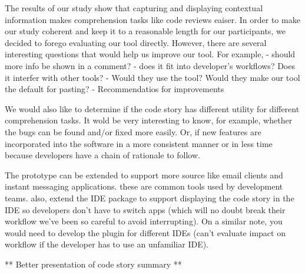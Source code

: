 \documentclass[../manifest.tex]{subfiles}
\begin{document}
The results of our study show that capturing and displaying contextual information makes comprehension tasks like code reviews eaiser. In order to make our study coherent and keep it to a reasonable length for our participants, we decided to forego evaluating our tool directly. However, there are several interesting questions that would help us improve our tool. For example,
  - should more info be shown in a comment?
  - does it fit into developer's workflows? Does it interfer with other tools?
  - Would they use the tool? Would they make our tool the default for pasting?
  - Recommendatios for improvements

We would also like to determine if the code story has different utility for different comprehension tasks. It wold be very interesting to know, for example, whether the bugs can be found and/or fixed more easily. Or, if new features are incorporated into the software in a more consistent manner or in less time because developers have a chain of rationale to follow.

The prototype can be extended to support more source like email clients and instant messaging applications. these are common tools used by development teams. also, extend the IDE package to support displaying the code story in the IDE so developers don't have to switch apps (which will no doubt break their workflow we've been so careful to avoid interrupting). On a similar note, you would need to develop the plugin for different IDEs (can't evaluate impact on workflow if the developer has to use an unfamiliar IDE).

** Better presentation of code story summary **
\end{document}
